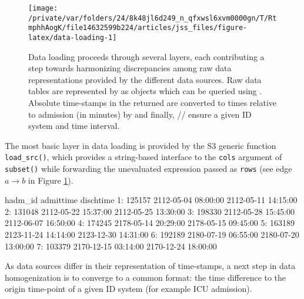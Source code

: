 \documentclass[
  notitle,
  nojss,
  noheadings]{jss}
\begin{document}
\begin{CodeChunk}
\begin{figure}

{\centering \texttt{[image: /private/var/folders/24/8k48jl6d249\_n\_qfxwsl6xvm0000gn/T/RtmphhAogK/file14632599b224/articles/jss\_files/figure-latex/data-loading-1]} 

}

\caption{Data loading proceeds through several layers, each contributing a step towards harmonizing discrepancies among raw data representations provided by the different data sources. Raw data tables are represented by  as  objects which can be queried using . Absolute time-stamps in the returned  are converted to times relative to admission (in minutes) by  and finally, /\allowbreak{}/\allowbreak{} ensure a given ID system and time interval.}\label{fig:data-loading}
\end{figure}
\end{CodeChunk}

The most basic layer in data loading is provided by the S3 generic
function \texttt{load\_src()}, which provides a string-based interface
to the \texttt{cols} argument of \texttt{subset()} while forwarding the
unevaluated expression passed as \texttt{rows} (see edge \(a \to b\) in
Figure \ref{fig:data-loading}).

\begin{CodeChunk}
\begin{CodeOutput}
   hadm_id           admittime           dischtime
1:  125157 2112-05-04 08:00:00 2112-05-11 14:15:00
2:  131048 2112-05-22 15:37:00 2112-05-25 13:30:00
3:  198330 2112-05-28 15:45:00 2112-06-07 16:50:00
4:  174245 2178-05-14 20:29:00 2178-05-15 09:45:00
5:  163189 2123-11-24 14:14:00 2123-12-30 14:31:00
6:  192189 2180-07-19 06:55:00 2180-07-20 13:00:00
7:  103379 2170-12-15 03:14:00 2170-12-24 18:00:00
\end{CodeOutput}
\end{CodeChunk}

As data sources differ in their representation of time-stamps, a next
step in data homogenization is to converge to a common format: the time
difference to the origin time-point of a given ID system (for example
ICU admission).
\end{document}
